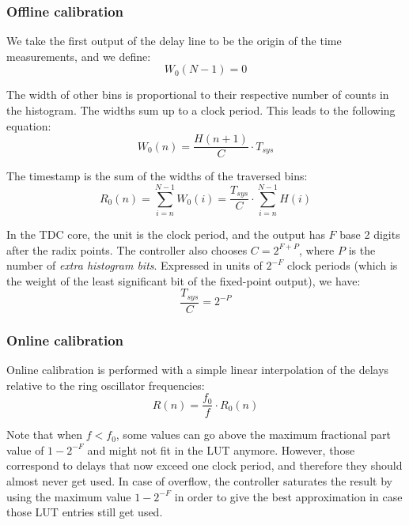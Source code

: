 \documentclass[a4paper,11pt]{article}
\begin{document}
\subsubsection{Offline calibration}
We take the first output of the delay line to be the origin of the time measurements, and we define:
\begin{equation}
W_{0}(N-1) = 0
\end{equation}

The width of other bins is proportional to their respective number of counts in the histogram. The widths sum up to a clock period. This leads to the following equation:
\begin{equation}
W_{0}(n) = \frac{H(n+1)}{C} \cdot T_{sys}
\end{equation}

The timestamp is the sum of the widths of the traversed bins:
\begin{equation}
R_{0}(n) = \displaystyle\sum\limits_{i=n}^{N-1}{W_{0}(i)} = \frac{T_{sys}}{C} \cdot \displaystyle\sum\limits_{i=n}^{N-1}{H(i)}
\end{equation}

In the TDC core, the unit is the clock period, and the output has $F$ base 2 digits after the radix points. The controller also chooses $C=2^{F+P}$, where $P$ is the number of \textit{extra histogram bits}. Expressed in units of $2^{-F}$ clock periods (which is the weight of the least significant bit of the fixed-point output), we have:
\begin{equation}
\frac{T_{sys}}{C}=2^{-P}
\end{equation}

\subsubsection{Online calibration}
Online calibration is performed with a simple linear interpolation of the delays relative to the ring oscillator frequencies:
\begin{equation}
R(n) = \frac{f_{0}}{f} \cdot R_{0}(n)
\end{equation}

Note that when $f < f_{0}$, some values can go above the maximum fractional part value of $1 - 2^{-F}$ and might not fit in the LUT anymore. However, those correspond to delays that now exceed one clock period, and therefore they should almost never get used. In case of overflow, the controller saturates the result by using the maximum value $1 - 2^{-F}$ in order to give the best approximation in case those LUT entries still get used.
\end{document}
